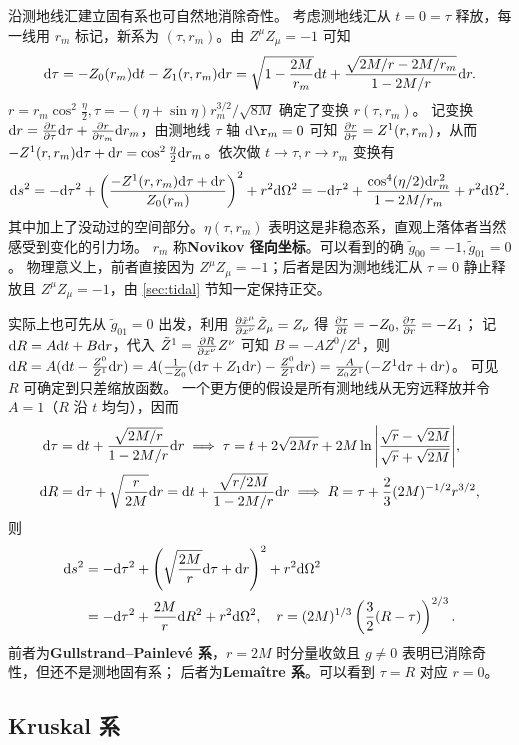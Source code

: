 沿测地线汇建立固有系也可自然地消除奇性。
考虑测地线汇从 $t = 0 = \tau$ 释放，每一线用 $r_m$ 标记，新系为 $(\tau,r_m)$。由 $Z^\mu Z_\mu = -1$ 可知
\[\dd\tau=-Z_0(r_m)\dd t-Z_1(r,r_m)\dd r=\sqrt{1-\frac{2M}{r_m}}\dd t+\frac{\sqrt{2M/{r}-2M/{r_m}}}{1-{2M}/{r}}\dd r.\]
$r = r_m\cos^2\frac{\eta}{2},\tau = -(\eta+\sin\eta){r_m^{3/2}}/{\sqrt{8M}}$ 确定了变换 $r(\tau,r_m)$。
记变换 $\dd r = \pdv{r}{\tau}\dd\tau + \pdv{r}{r_m}\dd r_m$，由测地线 $\tau$ 轴 $\d\r_m = 0$ 可知 $\pdv{r}{\tau} = Z^1(r,r_m)$，从而 $-Z^1(r,r_m)\dd\tau+\dd r=\cos^2\frac{\eta}{2}\dd r_m$。依次做 $t\to\tau,r\to r_m$ 变换有
\[\dd s^2 = -\dd\tau^2+\left(\frac{-Z^1(r,r_m)\dd\tau+\dd r}{Z_0(r_m)}\right)^2+r^2\dd\Omega^2= -\dd\tau^2+\frac{\cos^4({\eta}/{2})\dd r_m^2}{1-2M/r_m}+r^2\dd\Omega^2.\]
其中加上了没动过的空间部分。$\eta(\tau,r_m)$ 表明这是非稳态系，直观上落体者当然感受到变化的引力场。
$r_m$ 称\textbf{Novikov 径向坐标}。可以看到的确 $\tilde g_{00}=-1,\tilde g_{01}=0$。
物理意义上，前者直接因为 $Z^\mu Z_\mu = -1$；后者是因为测地线汇从 $\tau = 0$ 静止释放且 $Z^\mu Z_\mu = -1$，由 \ref{sec:tidal} 节知一定保持正交。

实际上也可先从 $\tilde g_{01}=0$ 出发，利用 $\pdv{\tilde x^\mu}{x^\nu}\tilde Z_\mu=Z_\nu$ 得 $\pdv{\tau}{t}=-Z_0,\pdv{\tau}{r}=-Z_1$；
记 $\dd R=A\dd t+B\dd r$，代入 $\tilde Z^1=\pdv{R}{x^\nu}Z^\nu$ 可知 $B=-AZ^0/Z^1$，则 $\dd R=A(\dd t-\frac{Z^0}{Z^1}\dd r)=A(\frac{1}{-Z_0}(\dd\tau+Z_1\dd r)-\frac{Z^0}{Z^1}\dd r)=\frac{A}{Z_0Z^1}(-Z^1\dd\tau+\dd r)$。
可见 $R$ 可确定到只差缩放函数。
一个更方便的假设是所有测地线从无穷远释放并令 $A=1$（$R$ 沿 $t$ 均匀），因而
\begin{align}
    \dd\tau &= \dd t+\frac{\sqrt{2M/r}}{1-{2M}/{r}}\dd r\implies \tau = t+2 \sqrt{2Mr}+2M\ln\abs{\frac{\sqrt{r}-\sqrt{2M}}{\sqrt{r}+\sqrt{2M}}},\\
    \dd R &= \dd\tau+\sqrt{\frac{r}{2M}}\dd r = \dd t+\frac{\sqrt{r/2M}}{1-{2M}/{r}}\dd r\implies R=\tau+\frac 23(2M)^{-1/2}r^{3/2},
\end{align}
则
\begin{align}
    \dd s^2 &= -\dd\tau^2+\left(\sqrt{\frac{2M}{r}}\dd\tau+\dd r\right)^2+r^2\dd\Omega^2\\
    &= -\dd\tau^2+\frac{2M}{r}\dd R^2+r^2\dd\Omega^2,\quad r=(2M)^{1/3}\left(\frac 32(R-\tau)\right)^{2/3}.
\end{align}
前者为\textbf{Gullstrand–Painlevé 系}，$r=2M$ 时分量收敛且 $g\ne 0$ 表明已消除奇性，但还不是测地固有系； 
后者为\textbf{Lemaître 系}。可以看到 $\tau=R$ 对应 $r=0$。

\subsection{Kruskal 系}

